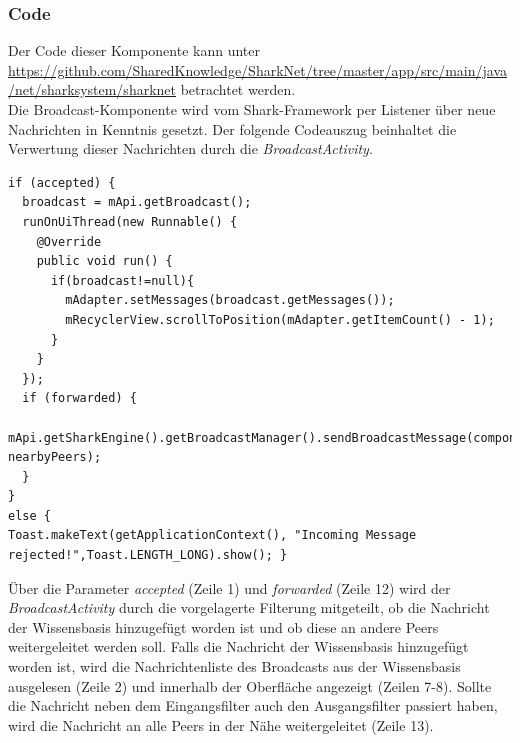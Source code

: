 \subsubsection{Code}
Der Code dieser Komponente kann unter \url{https://github.com/SharedKnowledge/SharkNet/tree/master/app/src/main/java/net/sharksystem/sharknet} betrachtet werden. 
\\Die Broadcast-Komponente wird vom Shark-Framework per Listener über neue Nachrichten in Kenntnis gesetzt. Der folgende Codeauszug beinhaltet die Verwertung dieser Nachrichten durch die \textit{BroadcastActivity}. \newline
 \lstset{language=Java, caption=Anzeige und Weiterleitungen von Nachrichten (Auszug), label=DescriptiveLabel, numbers=left, numbersep=1em, breaklines=true, basicstyle=\small}
\begin{lstlisting}
if (accepted) {
  broadcast = mApi.getBroadcast();
  runOnUiThread(new Runnable() {
    @Override
    public void run() {
      if(broadcast!=null){
        mAdapter.setMessages(broadcast.getMessages());
        mRecyclerView.scrollToPosition(mAdapter.getItemCount() - 1);
      }
    }
  });
  if (forwarded) {
    mApi.getSharkEngine().getBroadcastManager().sendBroadcastMessage(component, nearbyPeers);
  }
}
else {
Toast.makeText(getApplicationContext(), "Incoming Message rejected!",Toast.LENGTH_LONG).show(); }
\end{lstlisting}
Über die Parameter \textit{accepted} (Zeile 1) und \textit{forwarded} (Zeile 12) wird der \textit{BroadcastActivity} durch die vorgelagerte Filterung mitgeteilt, ob die Nachricht der Wissensbasis hinzugefügt worden ist und ob diese an andere Peers weitergeleitet werden soll. Falls die Nachricht der Wissensbasis hinzugefügt worden ist, wird die Nachrichtenliste des Broadcasts aus der Wissensbasis ausgelesen (Zeile 2) und innerhalb der Oberfläche angezeigt (Zeilen 7-8). Sollte die Nachricht neben dem Eingangsfilter auch den Ausgangsfilter passiert haben, wird die Nachricht an alle Peers in der Nähe weitergeleitet (Zeile 13). 

